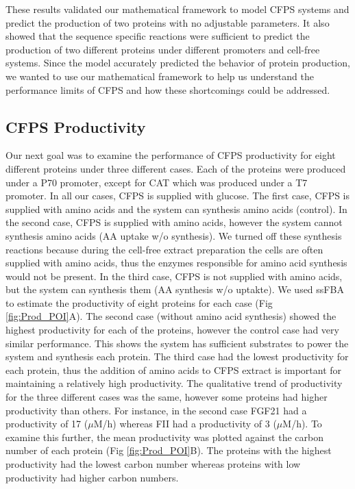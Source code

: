 \documentclass[journal=asbcd6,manuscript=article]{achemso}
\begin{document}
These results validated our mathematical framework to model CFPS systems and predict the production of two proteins with no adjustable parameters.
It also showed that the sequence specific reactions were sufficient to predict the production of two different proteins under different promoters and cell-free systems.
Since the model accurately predicted the behavior of protein production, we wanted to use our mathematical framework to help us understand the performance limits of CFPS and how these shortcomings could be addressed.

\subsection{CFPS Productivity}
Our next goal was to examine the performance of CFPS productivity for eight different proteins under three different cases. Each of the proteins were produced under a P70 promoter, except for CAT which was produced under a T7 promoter. In all our cases, CFPS is supplied with glucose. The first case, CFPS is supplied with amino acids and the system can synthesis amino acids (control). In the second case, CFPS is supplied with amino acids, however the system cannot synthesis amino acids (AA uptake w/o synthesis). We turned off these synthesis reactions because during the cell-free extract preparation the cells are often supplied with amino acids, thus the enzymes responsible for amino acid synthesis would not be present. In the third case, CFPS is not supplied with amino acids, but the system can synthesis them (AA synthesis w/o uptakte).
We used ssFBA to estimate the productivity of eight proteins for each case (Fig \ref{fig:Prod_POI}A).
The second case (without amino acid synthesis) showed the highest productivity for each of the proteins, however the control case had very similar performance.
This shows the system has sufficient substrates to power the system and synthesis each protein.
The third case had the lowest productivity for each protein, thus the addition of amino acids to CFPS extract is important for maintaining a relatively high productivity.
The qualitative trend of productivity for the three different cases was the same, however some proteins had higher productivity than others.
For instance, in the second case FGF21 had a productivity of 17 ($\mu$M/h) whereas FII had a productivity of 3 ($\mu$M/h).
To examine this further, the mean productivity was plotted against the carbon number of each protein (Fig \ref{fig:Prod_POI}B).
The proteins with the highest productivity had the lowest carbon number whereas proteins with low productivity had higher carbon numbers.
\end{document}

